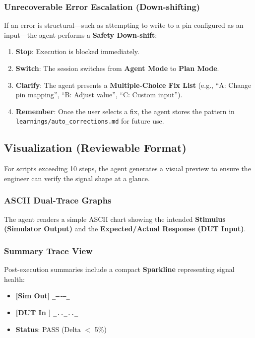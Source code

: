 \documentclass[conference]{IEEEtran}
\begin{document}
\subsubsection{Unrecoverable Error Escalation (Down-shifting)}
If an error is structural---such as attempting to write to a pin configured as an input---the agent performs a \textbf{Safety Down-shift}:
\begin{enumerate}
    \item \textbf{Stop}: Execution is blocked immediately.
    \item \textbf{Switch}: The session switches from \textbf{Agent Mode} to \textbf{Plan Mode}.
    \item \textbf{Clarify}: The agent presents a \textbf{Multiple-Choice Fix List} (e.g., ``A: Change pin mapping'', ``B: Adjust value'', ``C: Custom input'').
    \item \textbf{Remember}: Once the user selects a fix, the agent stores the pattern in \texttt{learnings/auto\_corrections.md} for future use.
\end{enumerate}

\subsection{Visualization (Reviewable Format)}
For scripts exceeding 10 steps, the agent generates a visual preview to ensure the engineer can verify the signal shape at a glance.
\subsubsection{ASCII Dual-Trace Graphs}
The agent renders a simple ASCII chart showing the intended \textbf{Stimulus (Simulator Output)} and the \textbf{Expected/Actual Response (DUT Input)}.
\subsubsection{Summary Trace View}
Post-execution summaries include a compact \textbf{Sparkline} representing signal health:
\begin{itemize}
    \item \textbf{[Sim Out]} \texttt{\_--\textasciitilde--\_}
    \item \textbf{[DUT In ]} \texttt{\_..\_..\_}
    \item \textbf{Status}: PASS (Delta $<$ 5\%)
\end{itemize}
\end{document}
